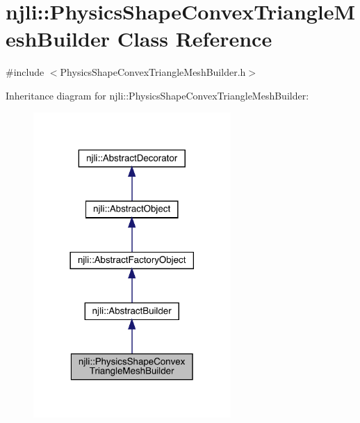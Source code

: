 \hypertarget{classnjli_1_1_physics_shape_convex_triangle_mesh_builder}{}\section{njli\+:\+:Physics\+Shape\+Convex\+Triangle\+Mesh\+Builder Class Reference}
\label{classnjli_1_1_physics_shape_convex_triangle_mesh_builder}


{\ttfamily \#include $<$Physics\+Shape\+Convex\+Triangle\+Mesh\+Builder.\+h$>$}



Inheritance diagram for njli\+:\+:Physics\+Shape\+Convex\+Triangle\+Mesh\+Builder\+:\nopagebreak
\begin{figure}[H]
\begin{center}
\leavevmode
\includegraphics[width=213pt]{classnjli_1_1_physics_shape_convex_triangle_mesh_builder__inherit__graph}
\end{center}
\end{figure}



